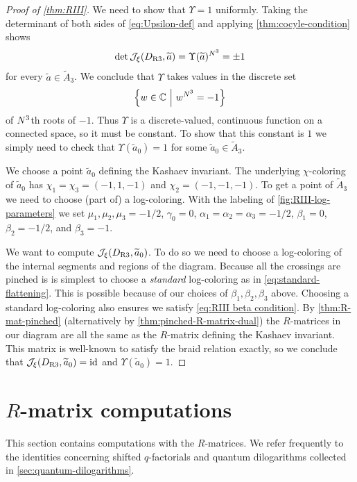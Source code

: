 \documentclass{sl2ams}
\numberwithin{equation}{section}
\newcommand{\CC}{\mathbb{C}}
\begin{document}
\begin{proof}[Proof of \cref{thm:RIII}]
  We need to show that \(\Upsilon = 1\) uniformly.
  Taking the determinant of both sides of \cref{eq:Upsilon-def} and applying \cref{thm:cocyle-condition} shows
  \[
    \det \jfunc(D_{\RIII}, \widetilde{a})
    =
    \Upsilon(\widetilde{a})^{\nr^3}
    =
    \pm 1
  \]
  for every \(\widetilde{a} \in \widetilde{A}_3\).
  We conclude that \(\Upsilon\) takes values in the discrete set \[\set{w \in \CC\given w^{\nr^3} = -1}\] of \(N^3\)th roots of \(-1\).
  Thus \(\Upsilon\) is a discrete-valued, continuous function on a connected space, so it must be constant.
  To show that this constant is \(1\) we simply need to check that \(\Upsilon(\widetilde{a}_0) = 1\) for some \(\widetilde{a}_0 \in \widetilde{A}_3\).

  We choose a point \(\widetilde{a}_{0}\) defining the Kashaev invariant.
  The underlying \(\chi\)-coloring of \(\widetilde{a}_0\) has \(\chi_1 = \chi_3 = (-1,1,-1)\) and \(\chi_2 = (-1,-1,-1)\).
  To get a point of \(\widetilde{A}_3\) we need to choose (part of) a log-coloring.
  With the labeling of \cref{fig:RIII-log-parameters} we set \(\mu_1, \mu_2, \mu_3 = -1/2\), \(\gamma_0 = 0\), \(\alpha_1 = \alpha_2 = \alpha_3 = -1/2\), \(\beta_1 = 0\), \(\beta_2 = -1/2\), and \(\beta_3 = -1\).

  We want to compute \(\jfunc(D_{\RIII}, \widetilde{a}_0)\).
  To do so we need to choose a log-coloring of the internal segments and regions of the diagram.
  Because all the crossings are pinched is is simplest to choose a \emph{standard} log-coloring as in \cref{eq:standard-flattening}.
  This is possible because of our choices of \(\beta_1, \beta_2, \beta_3\) above.
  Choosing a standard log-coloring also ensures we satisfy \cref{eq:RIII beta condition}.
  By \cref{thm:R-mat-pinched} (alternatively by \cref{thm:pinched-R-matrix-dual}) the \(R\)-matrices in our diagram are all the same as the \(R\)-matrix defining the Kashaev invariant.
  This matrix is well-known to satisfy the braid relation exactly, so we conclude that \(\jfunc(D_{\RIII}, \widetilde{a}_0) = \id\) and \(\Upsilon(\widetilde{a}_0) = 1\).
\end{proof}

\section{\texorpdfstring{\(R\)}{R}-matrix computations}
\label{sec:R-matrix-computations}
This section contains computations with the \(R\)-matrices.
We refer frequently to the identities concerning shifted \(q\)-factorials and quantum dilogarithms collected in \cref{sec:quantum-dilogarithms}.
\end{document}
